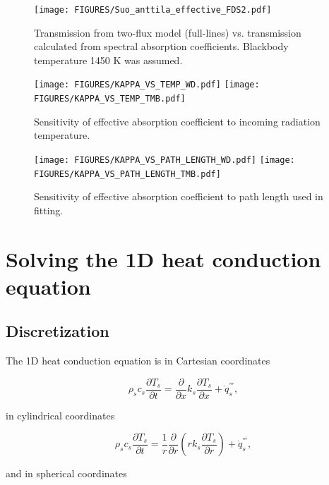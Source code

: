 \begin{figure}[ht]
    \centering
    \texttt{[image: FIGURES/Suo\_anttila\_effective\_FDS2.pdf]}
    \caption{Transmission from two-flux model (full-lines) vs. transmission calculated from spectral absorption coefficients. Blackbody temperature 1450 K was assumed.}
    \label{fig_trans3}
\end{figure}

\begin{figure}[ht]
    \centering
    \texttt{[image: FIGURES/KAPPA\_VS\_TEMP\_WD.pdf]}
    \texttt{[image: FIGURES/KAPPA\_VS\_TEMP\_TMB.pdf]}

    \caption{Sensitivity of effective absorption coefficient to incoming radiation temperature.}
    \label{fig_kapvtemp}
\end{figure}

\begin{figure}[ht]
    \centering
    \texttt{[image: FIGURES/KAPPA\_VS\_PATH\_LENGTH\_WD.pdf]}
    \texttt{[image: FIGURES/KAPPA\_VS\_PATH\_LENGTH\_TMB.pdf]}

    \caption{Sensitivity of effective absorption coefficient to path length used in fitting.}
    \label{fig_kapvPlength}
\end{figure}

\chapter{Solving the 1D heat conduction equation}\label{discretization}

\section{Discretization}
The 1D heat conduction equation is in Cartesian coordinates

\begin{equation}
\label{heat_cond_cart}
     \rho_s c_s \frac{\partial T_s}{\partial t} = \frac{\partial}{\partial x} k_s \frac{\partial T_s}{\partial x} + \dot{q}^{'''}_s,
\end{equation}

in cylindrical coordinates

\begin{equation}
\label{heat_cond_cyl}
     \rho_s c_s \frac{\partial T_s}{\partial t} = \frac{1}{r}\frac{\partial}{\partial r} (r k_s \frac{\partial T_s}{\partial r}) + \dot{q}^{'''}_s,
\end{equation}

and in spherical coordinates

